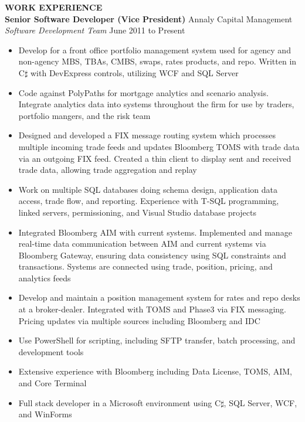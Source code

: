 \documentclass{article}
\begin{document}
\begin{flushleft}
\vspace{5pt}
\textbf{WORK EXPERIENCE}\\
\hspace{20pt}
\textbf{Senior Software Developer (Vice President)} \hfill Annaly Capital Management\\
\hspace{20pt}
\textit{Software Development Team} \hfill June 2011 to Present\\
\begin{itemize}[leftmargin=50pt,itemsep=-1pt]
\item Develop for a front office portfolio management system used for agency and non-agency MBS, TBAs, CMBS, swaps, rates products, and repo. Written in C$\sharp$ with DevExpress controls, utilizing WCF and SQL Server
\item Code against PolyPaths for mortgage analytics and scenario analysis. Integrate analytics data into systems throughout the firm for use by traders, portfolio mangers, and the risk team
\item Designed and developed a FIX message routing system which processes multiple incoming trade feeds and updates Bloomberg TOMS with trade data via an outgoing FIX feed. Created a thin client to display sent and received trade data, allowing trade aggregation and replay
\item Work on multiple SQL databases doing schema design, application data access, trade flow, and reporting. Experience with T-SQL programming, linked servers, permissioning, and Visual Studio database projects
\item Integrated Bloomberg AIM with current systems. Implemented and manage real-time data communication between AIM and current systems via Bloomberg Gateway, ensuring data consistency using SQL constraints and transactions. Systems are connected using trade, position, pricing, and analytics feeds
\item Develop and maintain a position management system for rates and repo desks at a broker-dealer. Integrated with TOMS and Phase3 via FIX messaging. Pricing updates via multiple sources including Bloomberg and IDC
\item Use PowerShell for scripting, including SFTP transfer, batch processing, and development tools
\item Extensive experience with Bloomberg including Data License, TOMS, AIM, and Core Terminal
\item Full stack developer in a Microsoft environment using C$\sharp$, SQL Server, WCF, and WinForms
\end{itemize}
 

\end{flushleft}
\end{document}
